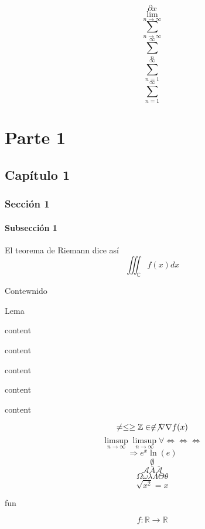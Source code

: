 \[ \partial{x} \] 
\[ \lim_{n \to \infty} \] 
\[ \sum_{n \to \infty} \] 
\[ \sum_{n}^{\infty} \] 
\[ \sum_{n = 1}^{\infty} \] 
\[ \sum_{n=1}^{\infty} \] 

\part{Parte 1}
\chapter{Capítulo 1}
\section{Sección 1}
\subsection{Subsección 1}

\begin{theo}[Riemann]
  El teorema de Riemann dice así \[ \iiint_{\mathbb{C}} f(x)dx \] 
\end{theo}

\begin{cor}[Awesome]
  Contewnido
\end{cor}

\begin{lem}[Título]
  Lema
\end{lem}

\begin{obs}
  content
\end{obs}

\begin{prop}
  content
\end{prop}

\begin{nota}
  content
\end{nota}

\begin{dem}
  content
\end{dem}

\begin{ejm}
  content
\end{ejm}

\[ \neq \leq \geq \mathbb{Z} \in \not\in \not \nabla \nabla f(x) \] 
\[ \limsup_{n \to \infty} \limsup_{n \to \infty} \forall \Longleftrightarrow \Leftrightarrow \Leftrightarrow\] 
\[ \Rightarrow e^{x} \ln(e) \] 
\[ \emptyset \] 
\[ \mathcal{A} \overline{A} \mathcal{\overline{A}}\] 
\[ \Omega \omega \lambda \Lambda \Theta \theta\]
\[ \sqrt{x^{2}} = x \] 

fun

\[ f: \mathbb{R} \to \mathbb{R} \] 


